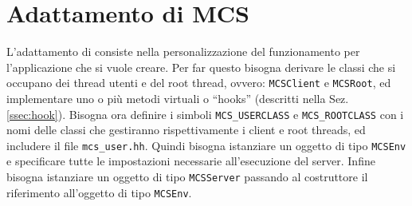 \section{Adattamento di MCS}
L'adattamento di \mcs consiste nella personalizzazione del
funzionamento per l'applicazione che si vuole creare. Per far questo
bisogna derivare le classi che si occupano dei thread utenti e del
root thread, ovvero: \verb|MCSClient| e \verb|MCSRoot|, ed
implementare uno o pi\`u metodi virtuali o ``hooks'' (descritti nella
Sez. \ref{ssec:hook}). Bisogna ora definire i simboli
\verb|MCS_USERCLASS| e \verb|MCS_ROOTCLASS| con i nomi delle classi
che gestiranno rispettivamente i client e root threads, ed includere
il file \verb|mcs_user.hh|. Quindi bisogna istanziare un oggetto di
tipo \verb|MCSEnv| e specificare tutte le impostazioni necessarie
all'esecuzione del server. Infine bisogna istanziare un oggetto di
tipo \verb|MCSServer| passando al costruttore il riferimento
all'oggetto di tipo \verb|MCSEnv|.

